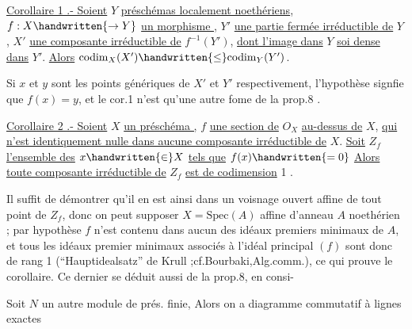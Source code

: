 \uline{Corollaire 1 .- Soient}  $Y$ \uline{  préschémas localement noethériens}, $f:X\handwritten{\to Y}$ \uline{un morphisme }, $Y'$ \uline{une partie fermée irréductible de} $Y$, $X'$ \uline{une composante irréductible de} $f^{-1}(Y')$, \uline{dont l'image dans} $Y$ \uline{soi dense dans} $Y'$. \uline{Alors} $\mathrm{codim}_X(X')\handwritten{\leq}\mathrm{codim}_Y(Y')$.

Si $x$ et $y$ sont les points génériques de $X'$ et $Y'$ respectivement,  l'hypothèse signfie que $f(x)=y$, et le cor.1 n'est qu'une autre fome de la prop.8 .

\uline{Corollaire 2 .- Soient} $X$ \uline{un préschéma  ,} $f$ \uline{une section de} $O_X$ \uline{au-dessus de} $X$, \uline{qui n'est identiquement nulle dans aucune composante irréductible de} $X$. \uline{Soit} $Z_f$ \uline{l'ensemble des} $x\handwritten{\in}X$ \uline{tels que} $f(x)\handwritten{=0}$ \uline{Alors toute composante irréductible de} $Z_f$ \uline{est de codimension} 1 .

Il suffit de démontrer qu'il en est ainsi dans un voisnage ouvert affine de tout point de $Z_f$, donc on peut supposer  $X=\mathrm{Spec}(A)$ affine d'anneau $A$ noethérien ; par hypothèse $f$ n'est  contenu dans aucun des idéaux premiers minimaux de $A$, et tous les idéaux premier minimaux associés à l'idéal principal $(f)$ sont donc de rang 1 (``Hauptidealsatz'' de Krull ;cf.Bourbaki,Alg.comm.\qquad), ce qui prouve le corollaire. Ce dernier se déduit aussi de la prop.8, en  consi-

Soit $N$ un autre module de prés. finie, Alors on a diagramme commutatif à lignes exactes



